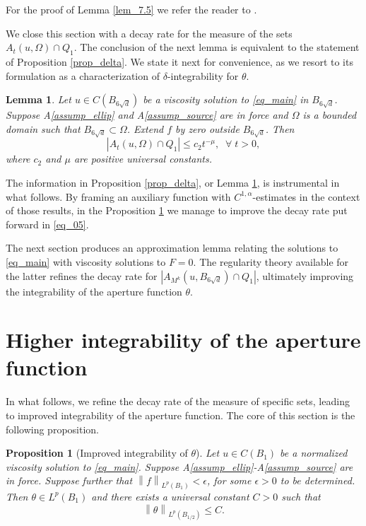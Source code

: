\documentclass[10pt]{article} %
\newtheorem{Lemma}{Lemma}
\newtheorem{Proposition}{Proposition}
\begin{document}
For the proof of Lemma \ref{lem_7.5} we refer the reader to \cite[Lemma 7.5]{cafcab}.

We close this section with a decay rate for the measure of the sets $A_t(u,\Omega)\cap Q_1$. The conclusion of the next lemma is equivalent to the statement of Proposition \ref{prop_delta}. We state it next for convenience, as we resort to its formulation as a characterization of $\delta$-integrability for $\theta$.

\begin{Lemma}\label{lem_7.8}
Let $u \in   C (B_{6\sqrt{d}})$ be a viscosity solution to \eqref{eq_main} in $B_{6\sqrt{d}}$. Suppose A\ref{assump_ellip} and A\ref{assump_source} are in force and $\Omega$ is a bounded domain such that $B_{6\sqrt{d}} \subset \Omega$.  Extend $f$ by zero outside $B_{6\sqrt{d}}$. Then
\begin{equation}\label{eq_05}
|A_t(u,\Omega)\cap Q_1| \leq c_2t^{-\mu}, \;\;\forall\;t>0,
\end{equation}
where $c_2$ and $\mu$ are positive universal constants.
\end{Lemma}

The information in Proposition \ref{prop_delta}, or Lemma \ref{lem_7.8}, is instrumental in what follows. By framing an auxiliary function with $C^{1,\alpha}$-estimates in the context of those results, in the Proposition \ref{prop_delta2} we manage to improve the decay rate put forward in \eqref{eq_05}.

The next section produces an approximation lemma relating the solutions to \eqref{eq_main} with viscosity solutions to $F=0$. The regularity theory available for the latter refines the decay rate for $|A_{M^k}(u, B_{6\sqrt{d}})\cap Q_1|$, ultimately improving the integrability of the aperture function $\theta$.

\section{Higher integrability of the aperture function}\label{sec_prov}

In what follows, we refine the decay rate of the measure of specific sets, leading to improved integrability of the aperture function. The core of this section is the following proposition.

\begin{Proposition}[Improved integrability of $\theta$]\label{prop_delta2}
Let $u \in   C (B_1)$ be a normalized viscosity solution to \eqref{eq_main}. Suppose A\ref{assump_ellip}-A\ref{assump_source} are in force. {{Suppose further that $\left\|f\right\|_{L^p(B_1)}<\epsilon$, for some $\epsilon>0$ to be determined}}. Then $\theta\in L^{p}(B_1)$ and there exists a universal constant $C>0$ such that
\[
	\left\|\theta\right\|_{L^{p}(B_{1/2})}  \leq  C.
\]
\end{Proposition}
\end{document}
